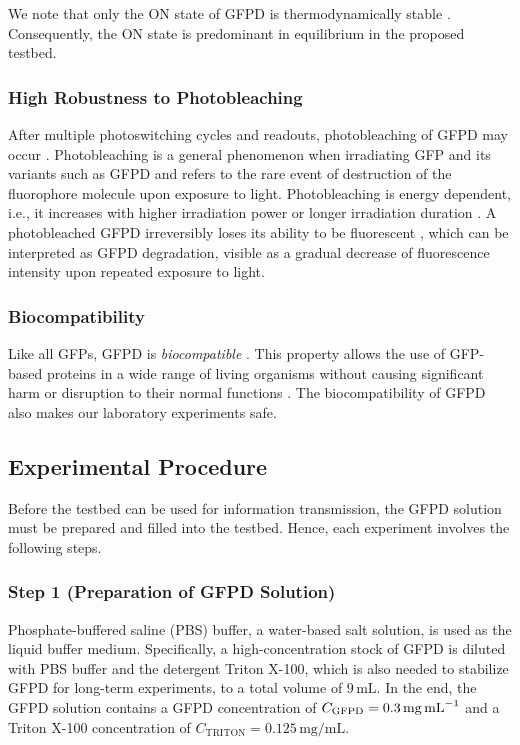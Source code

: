 We note that only the ON state of \ac{GFPD} is thermodynamically stable \cite{brakemann2011reversibly}. Consequently, the ON state is predominant in equilibrium in the proposed testbed.
%
\scaleSubsubsection
\subsubsection{High Robustness to Photobleaching}\label{par:photobleaching}
\scaleSubsubsectionBelow
After multiple photoswitching cycles and readouts, photobleaching of \ac{GFPD} may occur \cite{brakemann2011reversibly}. Photobleaching is a general phenomenon when irradiating \ac{GFP} and its variants such as \ac{GFPD} and refers to the rare event of destruction of the fluorophore molecule upon exposure to light. Photobleaching is energy dependent, i.e., it increases with higher irradiation power or longer irradiation duration \cite[Suppl. Fig. 7]{brakemann2011reversibly}.
A photobleached \ac{GFPD} irreversibly loses its ability to be fluorescent \cite{wang2016gmars, brakemann2011reversibly}, which can be interpreted as \ac{GFPD} degradation, visible as a gradual decrease of fluorescence intensity upon repeated exposure to light.
%
\scaleSubsubsection
\subsubsection{Biocompatibility}\label{sec:GFPD_bio}
\scaleSubsubsectionBelow
Like all \acp{GFP}, \ac{GFPD} is \textit{biocompatible} \cite{richards2003safety}. This property allows the use of \ac{GFP}-based proteins in a wide range of living organisms without causing significant harm or disruption to their normal functions \cite{richards2003safety}. The biocompatibility of \ac{GFPD} also makes our laboratory experiments safe.
%
\scaleSubsection
\subsection{Experimental Procedure} \label{SubSec:Procedure}
\scaleSubsectionBelow
%
Before the testbed can be used for information transmission, the \ac{GFPD} solution must be prepared and filled into the testbed. Hence, each experiment involves the following steps.
%
\scaleSubsubsection
\subsubsection{Step 1 (Preparation of GFPD Solution)} \label{SubSec:GFPD_Solution}
\scaleSubsubsectionBelow
%
Phosphate-buffered saline (PBS) buffer, a water-based salt solution, is used as the liquid buffer medium. Specifically, a high-concentration stock of \ac{GFPD} is diluted with PBS buffer and the detergent Triton X-100, which is also needed to stabilize \ac{GFPD} for long-term experiments, to a total volume of $9 \,\si{\milli\liter}$. In the end, the \ac{GFPD} solution contains a \ac{GFPD} concentration of $C_{\mathrm{GFPD}} = 0.3 \,\si{\milli\gram \per\milli\liter}$ and a Triton X-100 concentration of $C_{\mathrm{TRITON}} = 0.125 \,\si{\milli\gram \per\milli\liter}$.
%
\scaleSubsubsection
